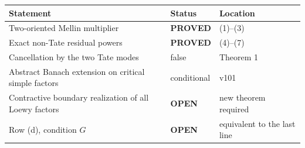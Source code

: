 \documentclass[11pt]{article}
\newcommand{\PROVED}{\textcolor{green!40!black}{\textbf{PROVED}}}
\newcommand{\OPEN}{\textcolor{red!70!black}{\textbf{OPEN}}}
\begin{document}
\begin{center}
\begin{tabular}{>{\raggedright\arraybackslash}p{.58\linewidth}
                >{\centering\arraybackslash}p{.15\linewidth}
                >{\raggedright\arraybackslash}p{.17\linewidth}}
\toprule
Statement & Status & Location \\
\midrule
Two-oriented Mellin multiplier & \PROVED & (1)--(3) \\
Exact non-Tate residual powers & \PROVED & (4)--(7) \\
Cancellation by the two Tate modes & false & Theorem 1 \\
Abstract Banach extension on critical simple factors & conditional & v101 \\
Contractive boundary realization of all Loewy factors & \OPEN & new theorem required \\
Row (d), condition $G$ & \OPEN & equivalent to the last line \\
\bottomrule
\end{tabular}
\end{center}
\end{document}
